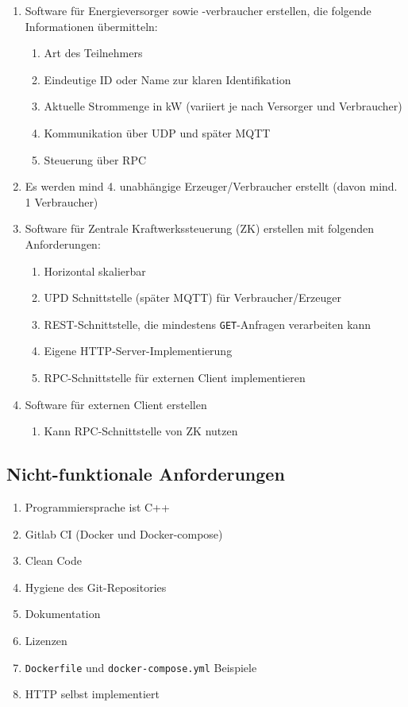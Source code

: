 \documentclass[
    fontsize=12pt,
    parskip=half
]{scrartcl}
\begin{document}
\begin{enumerate}
    \item Software für Energieversorger sowie -verbraucher erstellen, die folgende Informationen übermitteln:
    \begin{enumerate}
        \item Art des Teilnehmers
        \item Eindeutige ID oder Name zur klaren Identifikation
        \item Aktuelle Strommenge in kW (variiert je nach Versorger und Verbraucher)
        \item Kommunikation über UDP und später MQTT
        \item Steuerung über RPC
    \end{enumerate}
    \item Es werden mind 4. unabhängige Erzeuger/Verbraucher erstellt (davon mind. 1 Verbraucher)
    \item Software für Zentrale Kraftwerkssteuerung (ZK) erstellen mit folgenden Anforderungen:
    \begin{enumerate}
        \item Horizontal skalierbar
        \item UPD Schnittstelle (später MQTT) für Verbraucher/Erzeuger
        \item REST-Schnittstelle, die mindestens \texttt{GET}-Anfragen verarbeiten kann
        \item Eigene HTTP-Server-Implementierung
        \item RPC-Schnittstelle für externen Client implementieren
    \end{enumerate}
    \item Software für externen Client erstellen
    \begin{enumerate}
        \item Kann RPC-Schnittstelle von ZK nutzen
    \end{enumerate}
\end{enumerate}

\subsection{Nicht-funktionale Anforderungen}
\begin{enumerate}
    \item Programmiersprache ist C++
    \item Gitlab CI (Docker und Docker-compose)
    \item Clean Code
    \item Hygiene des Git-Repositories
    \item Dokumentation
    \item Lizenzen
    \item \texttt{Dockerfile} und \texttt{docker-compose.yml} Beispiele
    \item HTTP selbst implementiert
\end{enumerate}
\end{document}
